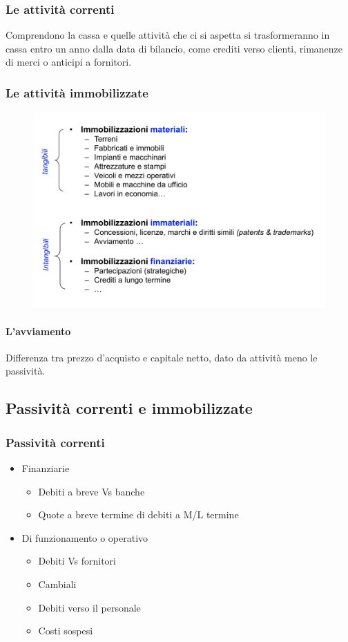 \documentclass{report}
\begin{document}
	\subsubsection{Le attività correnti}
	Comprendono la cassa e quelle attività che ci si aspetta si trasformeranno in cassa entro un anno dalla data di bilancio, come crediti verso clienti, rimanenze di merci o anticipi a fornitori.
	\newpage
	\subsubsection{Le attività immobilizzate}
	\begin{figure}[h]
		\centering
		\includegraphics[width=0.7\linewidth]{attivita-immobilizzate}
		\label{fig:attivita-immobilizzate}
	\end{figure}
	\paragraph{L'avviamento} Differenza tra prezzo d'acquisto e capitale netto, dato da attività meno le passività.
	\subsection{Passività correnti e immobilizzate}
	\subsubsection{Passività correnti}
	\begin{itemize}
		\item Finanziarie
		\begin{itemize}
			\item Debiti a breve Vs banche
			\item Quote a breve termine di debiti a M/L termine\\
		\end{itemize}
		\item Di funzionamento o operativo
		\begin{itemize}
			\item Debiti Vs fornitori
			\item Cambiali
			\item Debiti verso il personale
			\item Costi sospesi
		\end{itemize}
	\end{itemize}
\end{document}
